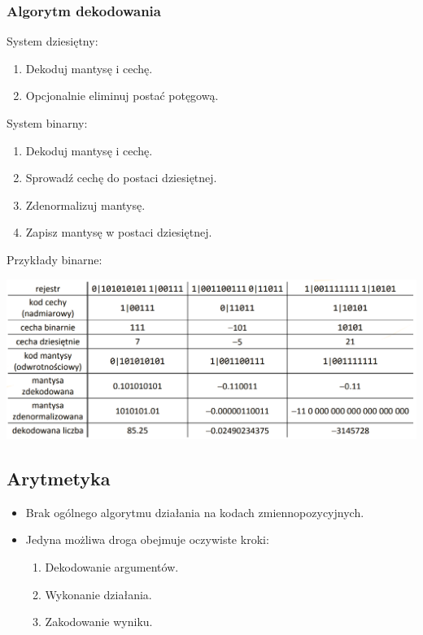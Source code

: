 \documentclass[12pt]{article}
\begin{document}
    \subsubsection{Algorytm dekodowania}

    System dziesiętny:
    \begin{enumerate}
        \item Dekoduj mantysę i cechę.
        \item Opcjonalnie eliminuj postać potęgową.
    \end{enumerate}

    System binarny:
    \begin{enumerate}
        \item Dekoduj mantysę i cechę.
        \item Sprowadź cechę do postaci dziesiętnej.
        \item Zdenormalizuj mantysę.
        \item Zapisz mantysę w postaci dziesiętnej.
    \end{enumerate}

    Przykłady binarne:

    \includegraphics[width=\linewidth]{graphics/number-repr/fl-pt-decode-bin.png}

    \subsection{Arytmetyka}
    \begin{itemize}
        \item Brak ogólnego algorytmu działania na kodach
        zmiennopozycyjnych.
        \item Jedyna możliwa droga obejmuje oczywiste
        kroki:
        \begin{enumerate}
            \item Dekodowanie argumentów.
            \item Wykonanie działania.
            \item Zakodowanie wyniku.
        \end{enumerate}
    \end{itemize}
\end{document}
